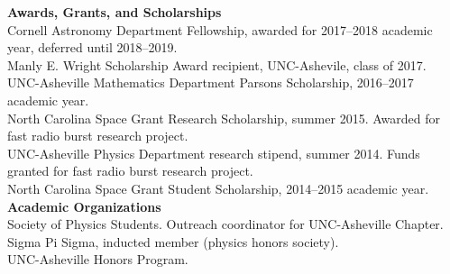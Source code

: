 \documentclass[a4paper, 11pt]{article}
\newcommand{\noi}{\noindent}
\begin{document}
\noi \textbf{Awards, Grants, and Scholarships}
\\

\noi Cornell Astronomy Department Fellowship, awarded for 2017--2018 academic year, deferred until 2018--2019.
\\

\noi Manly E. Wright Scholarship Award recipient, UNC-Ashevile, class of 2017.
\\

\noi UNC-Asheville Mathematics Department Parsons Scholarship, 2016--2017 academic year.
\\

\noi North Carolina Space Grant Research Scholarship, summer 2015. Awarded for fast radio burst research project.
\\

\noi UNC-Asheville Physics Department research stipend, summer 2014. Funds granted for fast radio burst research project.
\\

\noi North Carolina Space Grant Student Scholarship, 2014--2015 academic year.
\\


\noi \textbf{Academic Organizations}
\\

\noi Society of Physics Students. Outreach coordinator for UNC-Asheville Chapter.
\\

\noi Sigma Pi Sigma, inducted member (physics honors society).
\\

\noi UNC-Asheville Honors Program.
\end{document}
